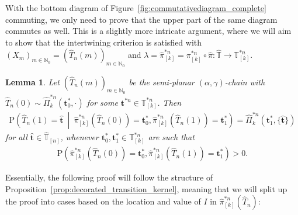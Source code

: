 \documentclass[a4paper, final]{amsart}
\theoremstyle{plain}
\newtheorem{lemma}[thm]{Lemma}
\theoremstyle{definition}
\newcommand{\tree}[1][t]{\boldsymbol{#1}}
\newcommand{\that}[1][t]{\hat{\boldsymbol{#1}}} %
\newcommand{\That}[1][T]{\widehat{#1}}
\newcommand{\Thatspace}[1][\T]{\widehat{\boldsymbol{#1}}} %
\newcommand{\T}{\mathbb{T}}
\renewcommand{\P}{\mathrm{P}}
\newcommand{\N}{\mathbb{N}}
\begin{document}
%
With the bottom diagram of Figure~\ref{fig:commutativediagram_complete} commuting, we only need to prove that the upper part of the same diagram commutes as well.
This is a slightly more intricate argument, where we will aim to show that the intertwining criterion is satisfied with ${\left( X_m \right)}_{m \in \N_0} = {\left( \That_n(m) \right)}_{m \in \N_0}$ and $\lambda = \hat{\pi}_{[k]}^{*n} = \pi_{[k]}^{*n} \circ \hat{\pi} \colon \Thatspace \to \T_{[k]}^{*n}$.
%
\begin{lemma}\label{lemma:intertwining}
  Let ${\left( \That_n(m) \right)}_{m \in \N_0}$ be the semi-planar $(\alpha, \gamma)$-chain with $\That_n(0) \sim \hat{\Pi}_{k}^{* n} (\tree_0^*, \cdot)$ for some $\tree^{* n} \in \T_{[k]}^{* n}$.
  Then 
  \begin{align*}
    \P \left( \That_n(1) = \that \ \middle \vert \ \hat{\pi}_{[k]}^{* n} \left( \That_n(0) \right) = \tree_0^*, \hat{\pi}_{[k]}^{* n} \left( \That_n(1) \right) = \tree_1^* \right)
    = \hat{\Pi}_k^{* n} (\tree_1^*, \{ \that \})
  \end{align*}
  for all $\that \in \Thatspace_{[n]}$, whenever $\tree_0^*, \tree_1^* \in \T_{[k]}^{*n}$ are such that
%
\begin{align*}
  \P \left( \hat{\pi}_{[k]}^{* n} \left( \That_n(0) \right) = \tree_0^*, \hat{\pi}_{[k]}^{* n} \left( \That_n(1) \right) = \tree_1^* \right) > 0.
\end{align*}
%
\end{lemma}
%
\noindent
Essentially, the following proof will follow the structure of Proposition~\ref{prop:decorated_transition_kernel}, meaning that we will split up the proof into cases based on the location and value of $I$ in $\hat{\pi}_{[k]}^{*n} \left( \That_n \right)$:
%
\end{document}
